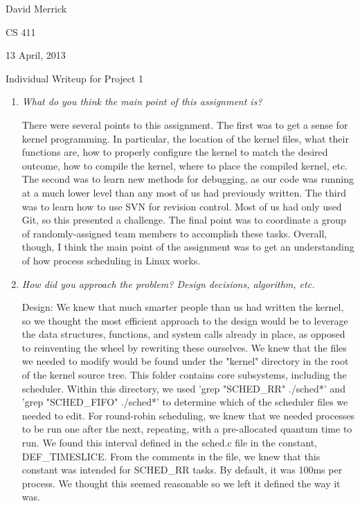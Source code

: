 \documentclass[letterpaper,10pt,titlepage]{article}
\newcommand{\tab}{\hspace*{2em}} %
\begin{document}
David Merrick

CS 411

13 April, 2013

\begin{center}
{\LARGE Individual Writeup for Project 1}
\end{center}

\begin{enumerate} 
\item \emph{What do you think the main point of this assignment is?}

\tab There were several points to this assignment. The first was to get a sense for kernel programming. In particular, the location of the kernel files, what their functions are, how to properly configure the kernel to match the desired outcome, how to compile the kernel, where to place the compiled kernel, etc. The second was to learn new methods for debugging, as our code was running at a much lower level than any most of us had previously written. The third was to learn how to use SVN for revision control. Most of us had only used Git, so this presented a challenge. The final point was to coordinate a group of randomly-assigned team members to accomplish these tasks. Overall, though, I think the main point of the assignment was to get an understanding of how process scheduling in Linux works.

\item \emph{How did you approach the problem? Design decisions, algorithm, etc.}

\tab Design: We knew that much smarter people than us had written the kernel, so we thought the most efficient approach to the design would be to leverage the data structures, functions, and system calls already in place, as opposed to reinventing the wheel by rewriting these ourselves. We knew that the files we needed to modify would be found under the "kernel" directory in the root of the kernel source tree. This folder contains core subsystems, including the scheduler. Within this directory, we used 'grep "SCHED_RR" ./sched*' and 'grep "SCHED_FIFO" ./sched*' to determine which of the scheduler files we needed to edit. For round-robin scheduling, we knew that we needed processes to be run one after the next, repeating, with a pre-allocated quantum time to run. We found this interval defined in the sched.c file in the constant, DEF_TIMESLICE. From the comments in the file, we knew that this constant was intended for SCHED_RR tasks. By default, it was 100ms per process. We thought this seemed reasonable so we left it defined the way it was. 


\end{enumerate}
\end{document}
